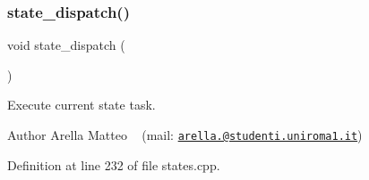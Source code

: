 \subsubsection{\texorpdfstring{state\+\_\+dispatch()}{state\_dispatch()}}
{\footnotesize\ttfamily void state\+\_\+dispatch (\begin{DoxyParamCaption}{ }\end{DoxyParamCaption})}



Execute current state task. 

\begin{DoxyAuthor}{Author}
Arella Matteo ~\newline
 (mail\+: \href{mailto:arella.1646983@studenti.uniroma1.it}{\tt arella.@studenti.\+uniroma1.\+it}) 
\end{DoxyAuthor}


Definition at line 232 of file states.\+cpp.

